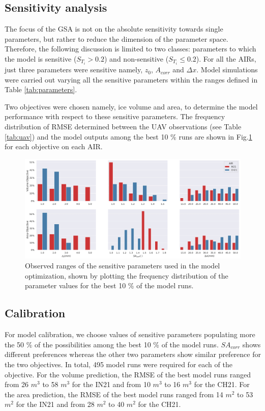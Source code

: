 \documentclass[utf8]{frontiersSCNS} %
\begin{document}
\subsection{Sensitivity analysis}

The focus of the GSA is not on the absolute sensitivity towards single parameters, but rather to reduce the dimension
of the parameter space. Therefore, the following discussion is limited to two classes: parameters to which the model is
sensitive ($S_{T_{i}} > 0.2$) and non-sensitive ($S_{T_{i}} \leq 0.2$). For all the AIRs, just three parameters were sensitive namely, $z_{0}$, $A_{corr}$ and $\Delta x$. Model simulations
were carried out varying all the sensitive parameters within the ranges defined in Table \ref{tab:parameters}.

Two objectives were chosen namely, ice volume and area, to determine the model performance with respect to these
sensitive parameters. The frequency distribution  of RMSE determined between the UAV observations (see Table
\ref{tab:uav}) and the model outputs among the best 10 \% runs are shown in Fig.\ref{fig:param_hist} for each
objective on each AIR.

\begin{figure}
	\begin{center}
		\includegraphics[width=\linewidth]{Figures/param_hist.jpg}
	\end{center}
	\caption{Observed ranges of the sensitive parameters used in the model optimization, shown by
		plotting the frequency distribution of the parameter values for the best 10 \% of the model runs. }
	\label{fig:param_hist}
\end{figure}

\subsection{Calibration}

For model calibration, we choose values of sensitive parameters populating more the 50 \% of the possibilities
among the best 10 \% of the model runs. $SA_{corr}$ shows different preferences whereas the other two parameters
show similar preference for the two objectives. In total, 495 model runs were required for each of the objective.
For the volume prediction, the RMSE of the best model runs ranged from 26 $m^3$ to 58 $m^3$ for the IN21 and from
10 $m^3$ to 16 $m^3$ for the CH21. For the area prediction, the RMSE of the best model runs ranged from 14 $m^2$ to
53 $m^2$ for the IN21 and from 28 $m^2$ to 40 $m^2$ for the CH21.
\end{document}

